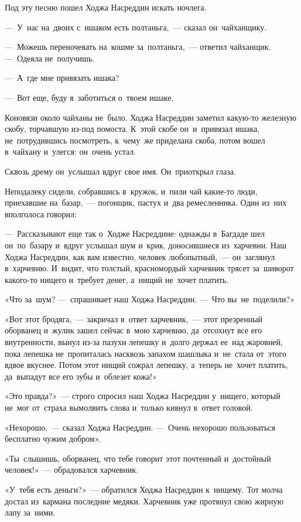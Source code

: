 \documentclass[12pt,a4paper]{book}
\begin{document}
Под эту песню пошел Ходжа Насреддин искать ночлега.

—~У~нас на~двоих с~ишаком есть полтаньга,~— сказал он~чайханщику.

—~Можешь переночевать на~кошме за~полтаньга,~— ответил чайханщик. —~Одеяла не~получишь.

—~А~где мне привязать ишака?

—~Вот еще, буду я~заботиться о~твоем ишаке.

Коновязи около чайханы не~было. Ходжа Насреддин заметил какую-то железную скобу, торчавшую из-под помоста. К~этой скобе он~и~привязал ишака, не~потрудившись посмотреть, к~чему~же приделана скоба, потом вошел в~чайхану и~улегся: он~очень устал.

Сквозь дрему он~услышал вдруг свое имя. Он~приоткрыл глаза.

Неподалеку сидели, собравшись в~кружок, и~пили чай какие-то люди, приехавшие на~базар,~— погонщик, пастух и~два ремесленника. Один из~них вполголоса говорил:

—~Рассказывают еще так о~Ходже Насреддине: однажды в~Багдаде шел он~по~базару и~вдруг услышал шум и~крик, доносившиеся из~харчевни. Наш Ходжа Насреддин, как вам известно, человек любопытный,~— он~заглянул в~харчевню. И~видит, что толстый, красномордый харчевник трясет за~шиворот какого-то нищего и~требует денег, а~нищий не~хочет платить.

«Что за~шум? —~спрашивает наш Ходжа Насреддин. —~Что вы~не~поделили?»

«Вот этот бродяга,~— закричал в~ответ харчевник,~— этот презренный оборванец и~жулик зашел сейчас в~мою харчевню, да~отсохнут все его внутренности, вынул из-за пазухи лепешку и~долго держал ее~над жаровней, пока лепешка не~пропиталась насквозь запахом шашлыка и~не~стала от~этого вдвое вкуснее. Потом этот нищий сожрал лепешку, а~теперь не~хочет платить, да~выпадут все его зубы и~облезет кожа!»

«Это правда?»~— строго спросил наш Ходжа Насреддин у~нищего, который не~мог от~страха вымолвить слова и~только кивнул в~ответ головой.

«Нехорошо,~— сказал Ходжа Насреддин. —~Очень нехорошо пользоваться бесплатно чужим добром».

«Ты~слышишь, оборванец, что тебе говорит этот почтенный и~достойный человек!»~— обрадовался харчевник.

«У~тебя есть деньги?»~— обратился Ходжа Насреддин к~нищему. Тот молча достал из~кармана последние медяки. Харчевник уже протянул свою жирную лапу за~ними.
\end{document}
